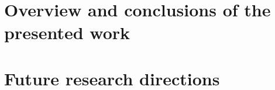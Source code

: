 \comment{\blindtext}

\section{Overview and conclusions of the presented work}

%

\section{Future research directions}